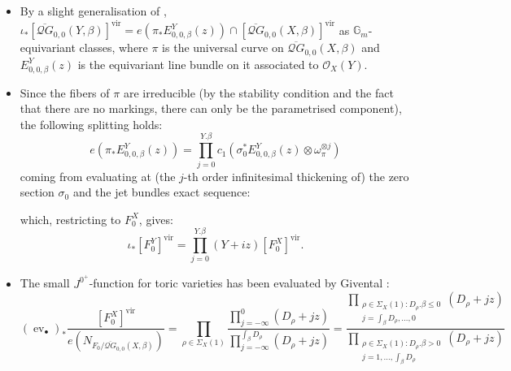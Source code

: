 \documentclass[11pt]{amsart}
\newcommand{\QG}[4]{\overline{\mathcal QG}_{#1,#2}(#3,#4)}
\newcommand{\Gm}{\mathbb{G}_m}
\newcommand{\ev}{\operatorname{ev}}
\theoremstyle{plain}
\theoremstyle{definition}
\begin{document}
\begin{center}
\end{center}

\begin{itemize}[leftmargin=*]
 \item By a slight generalisation of \cite[Propositions 6.2.2 and 6.2.3]{CFKM}, $\iota_*[\QG{0}{0}{Y}{\beta}]^{\text{vir}}=e(\pi_* E^Y_{0,0,\beta}(z))\cap[\QG{0}{0}{X}{\beta}]^{\text{vir}}$ as $\Gm$-equivariant classes, where $\pi$ is the universal curve on $\QG{0}{0}{X}{\beta}$ and $E^Y_{0,0,\beta}(z)$ is the equivariant line bundle on it associated to $\mathcal O_X(Y)$.
 \item Since the fibers of $\pi$ are irreducible (by the stability condition and the fact that there are no markings, there can only be the parametrised component), the following splitting holds:
 \[
  e(\pi_* E^Y_{0,0,\beta}(z))=\prod_{j=0}^{Y.\beta} c_1(\sigma_0^* E^Y_{0,0,\beta}(z)\otimes \omega_{\pi}^{\otimes j})
 \]
coming from evaluating at (the $j$-th order infinitesimal thickening of) the zero section $\sigma_0$ and the jet bundles exact sequence:
\begin{center}
\end{center}
which, restricting to $F_0^X$, gives:
\[
 \iota_*[F_0^Y]^{\text{vir}}=\prod_{j=0}^{Y.\beta}(Y+iz)[F_0^X]^{\text{vir}}.
\]
 \item The small $J^{0^+}$-function for toric varieties has been evaluated by Givental \cite{Givental-equivariantGW}\cite[Definition 7.2.8]{CF-K}:
 \[
  (\ev_{\bullet})_*\frac{[F_0^X]^{\text{vir}}}{e(N_{F_0/\QG{0}{0}{X}{\beta}})}=\prod_{\rho\in\Sigma_X(1)}\frac{\prod_{j=-\infty}^0(D_{\rho}+jz)}{\prod_{j=-\infty}^{\int_{\beta}D_{\rho}}(D_\rho+jz)}=\frac{\prod_{\substack{\rho\in\Sigma_X(1)\colon D_\rho.\beta\leq 0 \\ j=\int_{\beta}D_\rho,\ldots,0}}(D_{\rho}+jz)}{\prod_{\substack{\rho\in\Sigma_X(1)\colon D_\rho.\beta> 0 \\ j=1,\ldots,\int_{\beta}D_\rho}}(D_{\rho}+jz)}
\]
\end{itemize}
\end{document}
